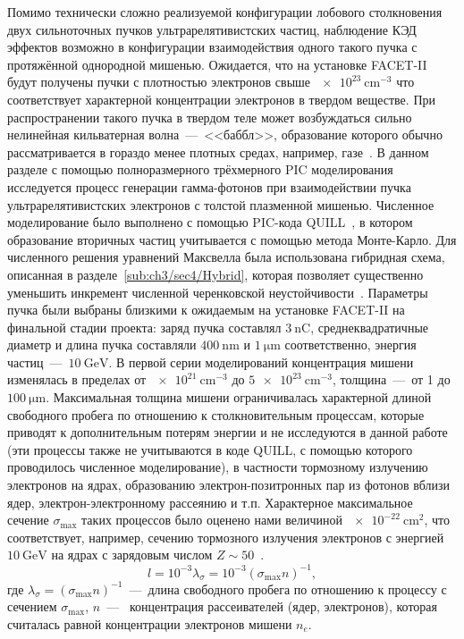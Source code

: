 Помимо технически сложно реализуемой конфигурации лобового столкновения двух сильноточных пучков ультрарелятивистских частиц, наблюдение КЭД эффектов возможно в конфигурации взаимодействия одного такого пучка с протяжённой однородной мишенью. 
Ожидается, что на установке FACET-II будут получены пучки с плотностью электронов свыше $\SI{e23}{\centi\meter^{-3}}$ что соответствует характерной концентрации электронов в твердом веществе.
При распространении такого пучка в твердом теле может возбуждаться сильно нелинейная кильватерная волна~---~<<баббл>>, образование которого обычно рассматривается в гораздо менее плотных средах, например, газе~\cite{rosenzweig1991acceleration, pukhov2002laser}.
В данном разделе с помощью полноразмерного трёхмерного PIC моделирования исследуется процесс генерации гамма-фотонов при взаимодействии пучка ультрарелятивистских электронов с толстой плазменной мишенью.
Численное моделирование было выполнено с помощью PIC-кода QUILL~\cite{QUILL}, в котором образование вторичных частиц учитывается с помощью метода Монте-Карло.
Для численного решения уравнений Максвелла была использована гибридная схема, описанная в разделе~\ref{sub:ch3/sec4/Hybrid}, которая позволяет существенно уменьшить инкремент численной черенковской неустойчивости~\cite{Birdsall1989, Meyers2014, Blinne2017}.
Параметры пучка были выбраны близкими к ожидаемым на установке FACET-II на финальной стадии проекта: заряд пучка составлял $\SI{3}{\nano\coulomb}$, среднеквадратичные диаметр и длина пучка составляли $\SI{400}{\nano\meter}$ и $\SI{1}{\um}$ соответственно, энергия частиц~---~$\SI{10}{\giga\electronvolt}$.
В первой серии моделирований концентрация мишени изменялась в пределах от $\SI{e21}{\centi\meter^{-3}}$ до $\SI{5e23}{\centi\meter^{-3}}$, толщина~---~от 1 до $\SI{100}{\um}$.
Максимальная толщина мишени ограничивалась характерной длиной свободного пробега по отношению к столкновительным процессам, которые приводят к дополнительным потерям энергии и не исследуются в данной работе (эти процессы также не учитываются в коде QUILL, с помощью которого проводилось численное моделирование), в частности тормозному излучению электронов на ядрах, образованию электрон-позитронных пар из фотонов вблизи ядер, электрон-электронному рассеянию и т.п.
Характерное максимальное сечение $\sigma_\mathrm{max}$ таких процессов было оценено нами величиной $\SI{e-22}{\centi\meter^2}$, что соответствует, например, сечению тормозного излучения электронов с энергией $\SI{10}{\giga\electronvolt}$ на ядрах с зарядовым числом $Z \sim 50$~\cite{berestetskii1982quantum}.
\begin{equation}
    \label{eq:ch3/sec3/freepath}
    l = 10^{-3} \lambda_\sigma = 10^{-3} \left( \sigma_\mathrm{max} n \right)^{-1},
\end{equation}
где $\lambda_\sigma = ( \sigma_\mathrm{max} n )^{-1}$~---~длина свободного пробега по отношению к процессу с сечением $\sigma_\mathrm{max}$, $n$~---~ концентрация рассеивателей (ядер, электронов), которая считалась равной концентрации электронов мишени $n_e$.

